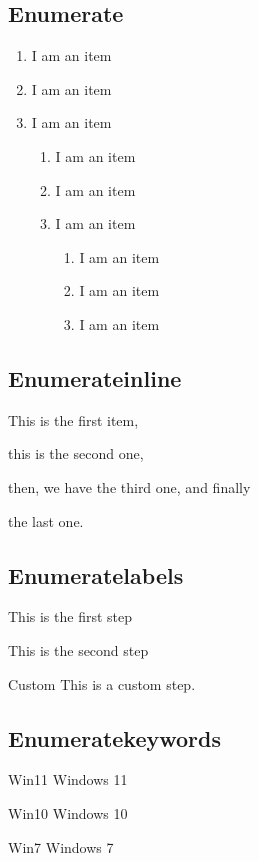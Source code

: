 \documentclass[10pt]{article}
\begin{document}
\subsection{Enumerate}
\begin{enumerate}
  \item I am an item
  \item I am an item
  \item I am an item
        \begin{enumerate}
          \item I am an item
          \item I am an item
          \item I am an item
                \begin{enumerate}
                  \item I am an item
                  \item I am an item
                  \item I am an item
                \end{enumerate}
        \end{enumerate}
\end{enumerate}

\subsection{Enumerateinline}
\begin{enumerateinline}
  \item This is the first item,
  \item this is the second one,
  \item then, we have the third one, and finally
  \item the last one.
\end{enumerateinline}

\subsection{Enumeratelabels}
\begin{enumeratelabels}[label={Step \arabic{*}:}]
  \item This is the first step
  \item This is the second step
  \item[Custom] This is a custom step.
\end{enumeratelabels}

\subsection{Enumeratekeywords}
\begin{enumeratekeywords}
  \item[Win11] Windows 11
  \item[Win10] Windows 10
  \item[Win7] Windows 7
\end{enumeratekeywords}
\end{document}
